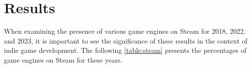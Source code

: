 \section{Results}
When examining the presence of various game engines on Steam for 2018, 2022, and 2023, it is important to see the significance of these results in the context of indie game development.
The following \autoref{table:steam} presents the percentages of game engines on Steam for these years.

\begin{table}[ht!]
    \caption{Percentage of total games identified on Steam (data collected 2022-09-30 and 2023-10-21)}
    \label{table:steam}
\end{table}

